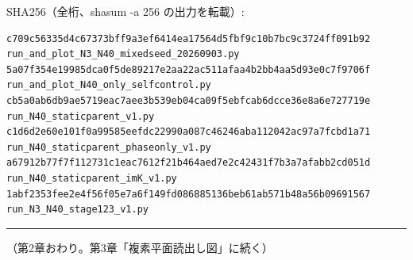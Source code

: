\documentclass[
  a4paper,
]{ltjsarticle}
\begin{document}
SHA256（全桁、shasum -a 256 の出力を転載）:

\begin{verbatim}
c709c56335d4c67373bff9a3ef6414ea17564d5fbf9c10b7bc9c3724ff091b92  run_and_plot_N3_N40_mixedseed_20260903.py
5a07f354e19985dca0f5de89217e2aa22ac511afaa4b2bb4aa5d93e0c7f9706f  run_and_plot_N40_only_selfcontrol.py
cb5a0ab6db9ae5719eac7aee3b539eb04ca09f5ebfcab6dcce36e8a6e727719e  run_N40_staticparent_v1.py
c1d6d2e60e101f0a99585eefdc22990a087c46246aba112042ac97a7fcbd1a71  run_N40_staticparent_phaseonly_v1.py
a67912b77f7f112731c1eac7612f21b464aed7e2c42431f7b3a7afabb2cd051d  run_N40_staticparent_imK_v1.py
1abf2353fee2e4f56f05e7a6f149fd086885136beb61ab571b48a56b09691567  run_N3_N40_stage123_v1.py
\end{verbatim}

\begin{center}\rule{0.5\linewidth}{0.5pt}\end{center}

（第2章おわり。第3章「複素平面読出し図」に続く）
\end{document}
